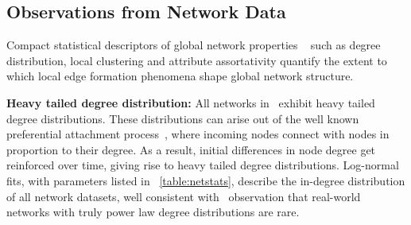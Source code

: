 %


\subsection{Observations from Network Data}
\label{subsec:factors}

Compact
statistical descriptors of global network properties ~\cite{newman2010networks}
such as degree distribution, local clustering and attribute assortativity
quantify the extent to which local edge formation phenomena shape global network
structure.

\textbf{Heavy tailed degree distribution:} All networks in~ exhibit heavy tailed degree distributions. These
distributions can arise out of the well known preferential attachment process~\cite{simon1955class,barabasi1999emergence}, where incoming nodes connect with nodes in proportion to their degree. As a result, initial differences in node
degree get reinforced over time, giving rise to heavy
tailed degree distributions.
Log-normal fits, with parameters listed in ~\cref{table:netstats}, describe the in-degree
distribution of all network datasets, well consistent with~\citet{broido2018scale} observation that real-world networks with truly power law
degree distributions are rare.

